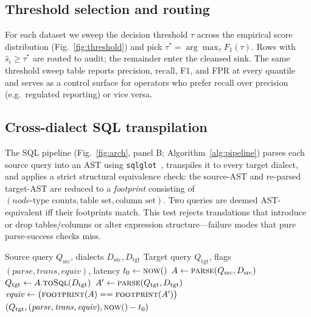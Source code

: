 \documentclass{ieeeaccess}
\begin{document}
\FloatBarrier

\subsection{Threshold selection and routing}
\label{subsec:routing}
For each dataset we sweep the decision threshold $\tau$ across the empirical score distribution
(Fig.~\ref{fig:threshold}) and pick $\tau^\ast = \arg\max_\tau F_1(\tau)$. Rows with $\hat{s}_i \ge \tau^\ast$
are routed to audit; the remainder enter the cleansed sink. The same threshold sweep table reports
precision, recall, F1, and FPR at every quantile and serves as a control surface for operators who prefer
recall over precision (e.g.\ regulated reporting) or vice versa.

\subsection{Cross-dialect SQL transpilation}
The SQL pipeline (Fig.~\ref{fig:arch}, panel B; Algorithm~\ref{alg:pipeline}) parses each source query
into an AST using \texttt{sqlglot}~\cite{sqlglot2024}, transpiles it to every target dialect, and applies
a strict structural equivalence check: the source-AST and re-parsed target-AST are reduced to a
\textit{footprint} consisting of $(node\text{-type counts}, \text{table set}, \text{column set})$.
Two queries are deemed AST-equivalent iff their footprints match. This test rejects translations that
introduce or drop tables/columns or alter expression structure---failure modes that pure parse-success
checks miss.

\begin{algorithm}[!htbp]
\caption{AST-Footprint-Verified Transpilation}
\label{alg:pipeline}
\begin{algorithmic}[1]
\Require Source query $Q_{\mathrm{src}}$, dialects $D_{\mathrm{src}}, D_{\mathrm{tgt}}$
\Ensure Target query $Q_{\mathrm{tgt}}$, flags $(\mathit{parse}, \mathit{trans}, \mathit{equiv})$, latency
\State $t_0 \gets \textsc{now}()$
\State $A \gets \textsc{parse}(Q_{\mathrm{src}}, D_{\mathrm{src}})$
\State $Q_{\mathrm{tgt}} \gets A.\textsc{toSql}(D_{\mathrm{tgt}})$
\State $A' \gets \textsc{parse}(Q_{\mathrm{tgt}}, D_{\mathrm{tgt}})$
\State $\mathit{equiv} \gets \big(\textsc{footprint}(A)==\textsc{footprint}(A')\big)$
\State \Return $(Q_{\mathrm{tgt}}, (\mathit{parse},\mathit{trans},\mathit{equiv}), \textsc{now}()-t_0)$
\end{algorithmic}
\end{algorithm}
\end{document}
